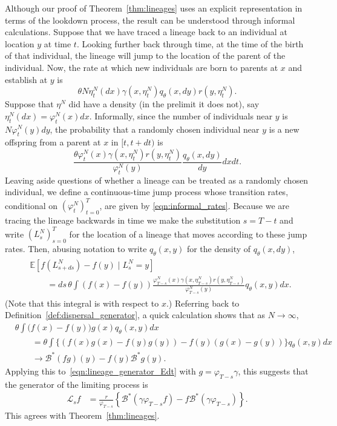 \documentclass[12pt]{article}
\newcommand{\IE}{\mathbb E}
\newcommand{\DG}{\mathcal{B}}  %
\newcommand{\Lgen}{\mathcal{L}}    %
\numberwithin{equation}{section}
\begin{document}
Although our proof of Theorem~\ref{thm:lineages}
uses an explicit representation in terms of the lookdown process,
the result can be understood through informal calculations.
Suppose that we have traced a lineage back to an individual 
at location $y$ at time $t$.
Looking further back through time, at the time of the birth of that 
individual, the lineage will jump to the location of the parent of the
individual.
Now, the rate at which new individuals are born to parents at $x$ 
and establish at $y$ is
$$
\theta N\eta^N_t(dx)    \gamma(x, \eta^N_t) q_\theta(x, dy) r(y, \eta^N_t) .
$$
Suppose that $\eta^N$ did have a density (in the prelimit it does not),
say $\eta^N_t(dx) = \varphi^N_t(x) dx$.
Informally,
since the number of individuals near $y$ is $N\varphi^N_t(y) dy$,
the probability that a randomly chosen individual near $y$
is a new offspring from a parent at $x$ in $[t, t+dt)$ is
\begin{equation} \label{eqn:informal_rates}
\frac{\theta
    \varphi^N_t(x) \gamma(x, \eta^N_t) r(y, \eta^N_t)
}{
    \varphi^N_t(y)
} \frac{ q_\theta(x, dy) }{ dy } dx dt .
\end{equation}
Leaving aside questions of whether a lineage can be treated 
as a randomly chosen individual, we define
a continuous-time jump process 
whose transition rates, conditional on $(\varphi^N_t)_{t=0}^T$, 
are given by \eqref{eqn:informal_rates}. Because we are tracing the
lineage backwards 
in time we make the substitution $s=T-t$ and write
$(L^N_s)_{s=0}^T$ for the location of a lineage that moves 
according to these jump rates.
Then, abusing notation to write 
$q_\theta(x, y)$ for the density of $q_\theta(x,dy)$,
\begin{align} \label{eqn:lineage_generator_Edt}
    \begin{split}
    &\IE[f(L^N_{s+ds}) - f(y) \;|\; L^N_s = y]
    \\&\qquad 
    =
    ds\, \theta \int \left(f(x) - f(y)\right)
    \frac{
        \varphi^N_{T-s}(x) \gamma(x, \eta^N_{T-s}) r(y, \eta^N_{T-s})
    }{
        \varphi^N_{T-s}(y)
    }
    q_\theta(x, y) dx .
    \end{split}
\end{align}
(Note that this integral is with respect to $x$.)
Referring back to Definition~\ref{def:dispersal_generator},
a quick calculation shows that as $N \to \infty$,
\begin{align*}
    &
    \theta \int \big(f(x) - f(y)\big) g(x) q_\theta(x, y) dx \\
    &\qquad =
    \theta \int \big\{
        (f(x) g(x) - f(y) g(y)) - f(y) (g(x) - g(y))
    \big\} q_\theta(x, y) dx \\
    &\qquad \to
        \DG^*(fg)(y) - f(y) \DG^* g(y) . 
\end{align*}
Applying this to~\eqref{eqn:lineage_generator_Edt} with $g = \varphi_{T-s} \gamma$,
this suggests that the generator of the limiting process is
\begin{align} \label{eqn:heuristic_lineage_generator}
    \Lgen_s f
    &=
    \frac{r}{\varphi_{T-s}}
    \left\{
        \DG^*(\gamma \varphi_{T-s} f) - f \DG^*(\gamma \varphi_{T-s})
    \right\} .
\end{align}
This agrees with Theorem~\ref{thm:lineages}.
\end{document}
